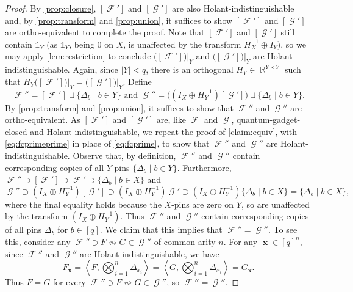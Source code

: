 \documentclass{theoretics}
\DeclareMathOperator{\rr}{\mathbb{R}}
\DeclareMathOperator{\vx}{\mathbf{x}}
\DeclareMathOperator{\fc}{\mathcal{F}}
\DeclareMathOperator{\gc}{\mathcal{G}}
\begin{document}
\begin{proof}
    By \autoref{prop:closure}, $[\fc']$ and $[\gc']$ are also Holant-indistinguishable
    and, by \autoref{prop:transform} and \autoref{prop:union}, 
    it suffices to show $[\fc']$ and $[\gc']$ are
    ortho-equivalent to complete the proof. 
    Note that $[\fc']$ 
    and $[\gc']$ still contain $\mathds{1}_Y$ (as $\mathds{1}_Y$, being 0 on $X$, is unaffected
    by the transform $H_X^{-1} \oplus I_Y$), so we may
    apply \autoref{lem:restriction} to conclude
    $\big([\fc']\big)\big|_Y$ and $\big([\gc']\big)\big|_Y$ are Holant-indistinguishable. 
    Again, since $|Y| < q$, there is an orthogonal
    $H_Y \in \rr^{Y \times Y}$ such that $H_Y\big([\fc']\big)\big|_Y = \big([\gc']\big)\big|_Y$. Define
    \begin{equation}
        \fc'' = [\fc'] \sqcup \{\Delta_b \mid b \in Y\} \text{ and }
        \gc'' = \big((I_X \oplus H_Y^{-1}) [\gc'] \big) \sqcup \{\Delta_b \mid b \in Y\}.
    \label{eq:fcprimeprime}
    \end{equation}
    By \autoref{prop:transform} and \autoref{prop:union}, it suffices to show that $\fc''$ and $\gc''$
    are ortho-equivalent. 
    As $[\fc']$ and $[\gc']$ are, like $\fc$ and $\gc$, quantum-gadget-closed and 
    Holant-indistinguishable, we repeat the proof of \autoref{claim:equiv},
    with \eqref{eq:fcprimeprime} in place of \eqref{eq:fcprime}, to show that
    $\fc''$ and $\gc''$ are Holant-indistinguishable.
    Observe that, by definition, $\fc''$ and $\gc''$ contain corresponding
    copies of all $Y$-pins $\{\Delta_b \mid b \in Y\}$.
    Furthermore, $\fc'' \supset [\fc'] \supset \fc' \supset \{\Delta_b \mid b \in X\}$
    and 
    \[
        \gc'' \supset (I_X \oplus H_Y^{-1})[\gc'] \supset (I_X \oplus H_Y^{-1})\gc' \supset (I_X \oplus H_Y^{-1})\{\Delta_b \mid b \in X\} = \{\Delta_b \mid b \in X\},
    \]
    where the final equality holds because the $X$-pins are zero on $Y$, so are unaffected by the
    transform $(I_X \oplus H_Y^{-1})$. Thus $\fc''$ and $\gc''$ contain corresponding copies of all
    pins $\Delta_b$ for $b \in [q]$. 
    We claim that this implies that $\fc'' = \gc''$.
    To see this, consider any $\fc'' \ni F \leftrightsquigarrow G \in \gc''$
    of common arity $n$. For any $\vx \in [q]^n$, since $\fc''$ and $\gc''$ are Holant-indistinguishable, 
    we have
    \[
        F_{\vx} = \left\langle F,\bigotimes_{i=1}^n \Delta_{x_i} \right\rangle 
        = \left\langle G,\bigotimes_{i=1}^n \Delta_{x_i} \right\rangle = G_{\vx}.
    \]
    Thus $F = G$ for every $\fc'' \ni F \leftrightsquigarrow G \in \gc''$, so $\fc'' = \gc''$.
\end{proof}
\end{document}
